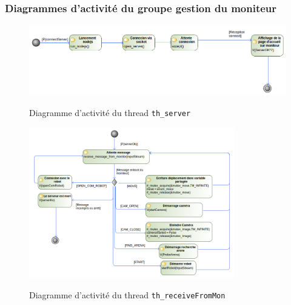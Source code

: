 \documentclass[11pt, a4paper]{paper}
\begin{document}
\subsubsection{Diagrammes d'activité  du groupe gestion du moniteur}

\begin{figure}[H]
\label{fig:th_server}
\begin{center}
{\includegraphics[width=1.0\textwidth]{./figures-pdf/th_server}}
{\caption{Diagramme d'activité du thread {\tt th\_server}}}
\end{center}
\end{figure}

\begin{figure}[H]
\label{fig:th_receiveFromMon}
\begin{center}
{\includegraphics[width=0.8\textwidth]{./figures-pdf/th_receiveFromMon.png}}
{\caption{Diagramme d'activité du thread {\tt th\_receiveFromMon}}}
\end{center}
\end{figure}
\end{document}
